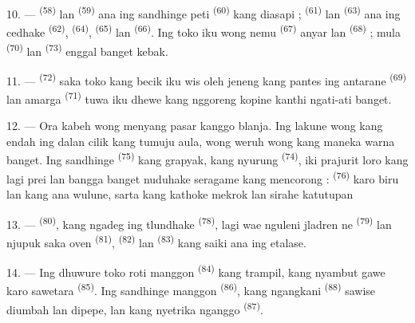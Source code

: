 \VUsaut{4.0mm}
\VUsaut{3.0mm}

10. ---  \textsuperscript{(58)} lan 
\textsuperscript{(59)} ana ing sandhinge peti 
\textsuperscript{(60)} kang diasapi ; 
\textsuperscript{(61)} lan  \textsuperscript{(63)} ana ing
cedhake  \textsuperscript{(62)}, 
\textsuperscript{(64)},  \textsuperscript{(65)} lan
 \textsuperscript{(66)}. Ing toko iku wong nemu
 \textsuperscript{(67)} anyar lan 
\textsuperscript{(68)} ; mula  \textsuperscript{(70)} lan
 \textsuperscript{(73)} enggal banget kebak.

11. ---  \textsuperscript{(72)} saka toko kang becik iku wis
oleh jeneng kang pantes ing antarane 
\textsuperscript{(69)} lan  amarga
 \textsuperscript{(71)} tuwa iku dhewe kang nggoreng
kopine kanthi ngati-ati banget.

\VUsaut{4.0mm}
\VUsaut{3.0mm}

12. --- Ora kabeh wong menyang pasar kanggo blanja. Ing lakune wong
kang endah ing dalan cilik kang tumuju aula, wong weruh wong kang
maneka warna banget. Ing sandhinge 
\textsuperscript{(75)} kang grapyak, kang nyurung  \textsuperscript{(74)}, iki prajurit loro kang lagi prei lan
bangga banget nuduhake seragame kang mencorong :  \textsuperscript{(76)} karo  biru lan
 kang ana wulune, sarta  kang
kathoke mekrok lan sirahe katutupan 

13. ---  \textsuperscript{(80)}, kang ngadeg ing
tlundhake  \textsuperscript{(78)}, lagi wae nguleni
jladren ne \textsuperscript{(79)} lan njupuk saka oven
 \textsuperscript{(81)}, 
\textsuperscript{(82)} lan  \textsuperscript{(83)} kang
saiki ana ing etalase.

14. --- Ing dhuwure toko roti manggon 
\textsuperscript{(84)} kang trampil, kang nyambut gawe karo sawetara
 \textsuperscript{(85)}. Ing sandhinge
manggon  \textsuperscript{(86)}, kang
ngangkani  \textsuperscript{(88)} sawise diumbah
lan dipepe, lan kang nyetrika nganggo 
\textsuperscript{(87)}.

